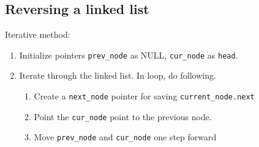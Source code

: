 \documentclass[a4paper,11pt]{book}
\begin{document}
\subsection{Reversing a linked list}
\vspace{5mm}

\noindent Iterative method:

\begin{enumerate}
    \item Initialize pointers \lstinline{prev_node} as NULL, \lstinline{cur_node} as \lstinline{head}.
    \item Iterate through the linked list. In loop, do following.
    \begin{enumerate}
        \item Create a \lstinline{next_node} pointer for saving \lstinline{current_node.next}
        \item Point the \lstinline{cur_node} point to the previous node.
        \item Move \lstinline{prev_node} and \lstinline{cur_node} one step forward 
    \end{enumerate}
\end{enumerate}
\end{document}
